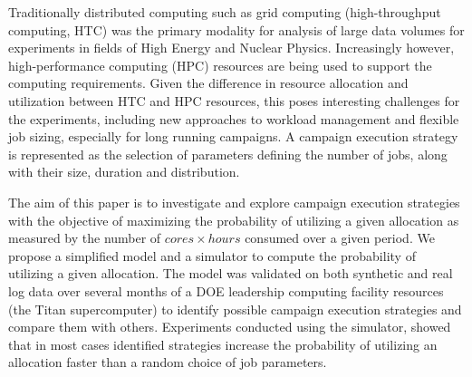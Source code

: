 Traditionally distributed computing such as grid computing 
(high-throughput computing, HTC) was the primary modality for analysis 
of large data volumes for experiments in fields of High Energy and Nuclear 
Physics. Increasingly however, high-performance computing (HPC) resources 
are being used to support the computing requirements.
Given the difference in resource allocation and utilization between HTC 
and HPC resources, this poses interesting challenges for the experiments, 
including new approaches to workload management and flexible job sizing, 
especially for long running campaigns. 
A campaign execution strategy is represented as the selection of parameters defining 
the number of jobs, along with their size, duration and distribution. 

The aim of this paper is to investigate and explore campaign execution strategies with
the objective of maximizing the probability of utilizing a given allocation as
measured by the number of $cores \times hours$ consumed over a given period. We propose
a simplified model and a simulator to compute the probability of utilizing a
given allocation. The model was validated on both synthetic and real log data
over several months of a DOE leadership computing facility resources (the Titan 
supercomputer) to identify possible campaign execution strategies and compare them 
with others. 
Experiments conducted using the simulator, showed that in most cases identified 
strategies increase the probability of utilizing an allocation faster than 
a random choice of job parameters.



